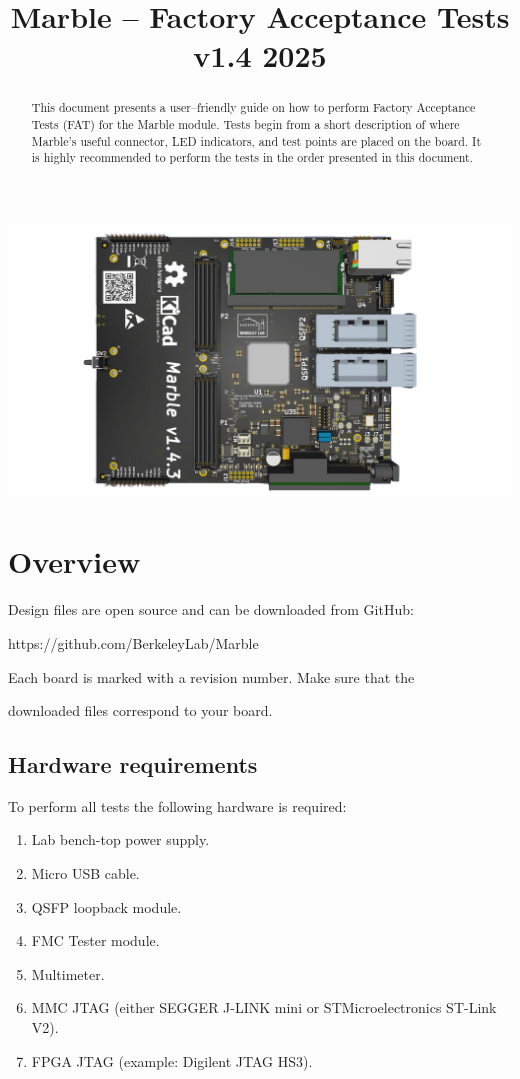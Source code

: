 \documentclass[12pt,oneside,a4]{article}
\title{Marble -- Factory Acceptance Tests\\ \small{v1.4 2025}}
\begin{document}
\maketitle
\begin{center}
\includegraphics[width=0.8\linewidth]{marble_top.png}
\end{center}
\begin{abstract}
This document presents a user--friendly guide on how to perform Factory Acceptance Tests (FAT) for the Marble module. Tests begin from a short description of where Marble's useful connector, LED indicators, and test points are placed on the board. It is highly recommended to perform the tests in the order presented in this document.
\end{abstract}

\clearpage
\tableofcontents

\clearpage

\section{Overview}

\begin{leftbar}
Design files are open source and can be downloaded from GitHub:

https://github.com/BerkeleyLab/Marble
\end{leftbar}


\begin{leftbar}
Each board is marked with a revision number. Make sure that the

downloaded files correspond to your board.
\end{leftbar}

\subsection{Hardware requirements}
To perform all tests the following hardware is required:
\begin{enumerate}
    \item Lab bench-top power supply.
    \item Micro USB cable.
    \item QSFP loopback module.
    \item FMC Tester module.
    \item Multimeter.
    \item MMC JTAG (either SEGGER J-LINK mini or STMicroelectronics ST-Link V2).
    \item FPGA JTAG (example: Digilent JTAG HS3).
\end{enumerate}
\end{document}
